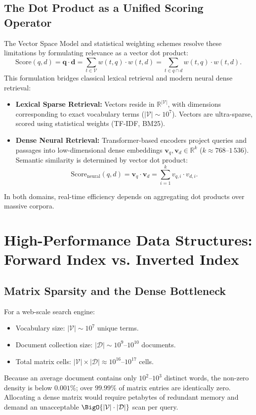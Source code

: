 \subsection{The Dot Product as a Unified Scoring Operator}
The Vector Space Model and statistical weighting schemes resolve these limitations by formulating relevance as a vector dot product:
\begin{equation}
\text{Score}(q, d) = \mathbf{q} \cdot \mathbf{d} = \sum_{t \in \mathcal{V}} w(t, q) \cdot w(t, d) = \sum_{t \in q \cap d} w(t, q) \cdot w(t, d).
\label{eq:dot-product-en}
\end{equation}
This formulation bridges classical lexical retrieval and modern neural dense retrieval:
\begin{itemize}
    \item \textbf{Lexical Sparse Retrieval:} Vectors reside in $\mathbb{R}^{|\mathcal{V}|}$, with dimensions corresponding to exact vocabulary terms ($|\mathcal{V}| \sim 10^7$). Vectors are ultra-sparse, scored using statistical weights (TF-IDF, BM25).
    \item \textbf{Dense Neural Retrieval:} Transformer-based encoders project queries and passages into low-dimensional dense embeddings $\mathbf{v}_q, \mathbf{v}_d \in \mathbb{R}^k$ ($k \approx 768\text{--}1\,536$). Semantic similarity is determined by vector dot product:
    \begin{equation}
    \text{Score}_{\text{neural}}(q, d) = \mathbf{v}_q \cdot \mathbf{v}_d = \sum_{i=1}^k v_{q,i} \cdot v_{d,i}.
    \end{equation}
\end{itemize}
In both domains, real-time efficiency depends on aggregating dot products over massive corpora.

\FloatBarrier
\section{High-Performance Data Structures: Forward Index vs. Inverted Index}
\label{sec:forward-vs-inverted-en}

\subsection{Matrix Sparsity and the Dense Bottleneck}
For a web-scale search engine:
\begin{itemize}
    \item Vocabulary size: $|\mathcal{V}| \sim 10^7$ unique terms.
    \item Document collection size: $|\mathcal{D}| \sim 10^9 \text{--} 10^{10}$ documents.
    \item Total matrix cells: $|\mathcal{V}| \times |\mathcal{D}| \approx 10^{16} \text{--} 10^{17}$ cells.
\end{itemize}
Because an average document contains only $10^2\text{--}10^3$ distinct words, the non-zero density is below $0.001\%$; over $99.99\%$ of matrix entries are identically zero. Allocating a dense matrix would require petabytes of redundant memory and demand an unacceptable $\BigO{|\mathcal{V}| \cdot |\mathcal{D}|}$ scan per query.

